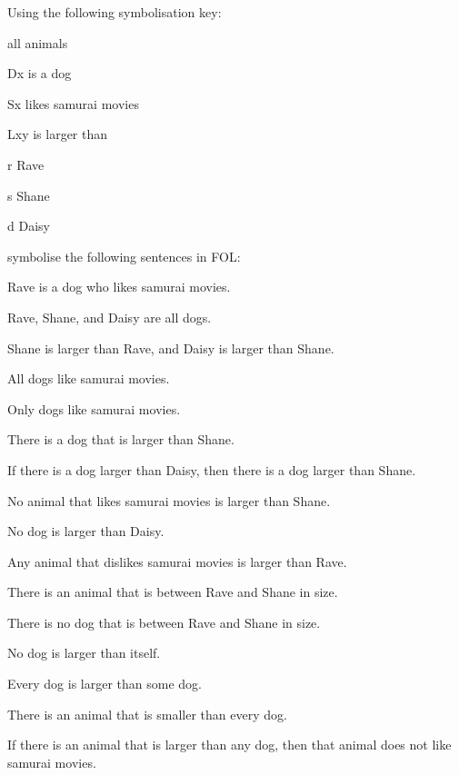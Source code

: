 \problempart 
Using the following symbolisation key:
\begin{ekey}
\item[\text{domain}] all animals
\item[Dx]  is a dog
\item[Sx]  likes samurai movies
\item[Lxy]  is larger than 
\item[r] Rave
\item[s] Shane
\item[d] Daisy
\end{ekey}
symbolise the following sentences in FOL:
\begin{earg}
\item Rave is a dog who likes samurai movies.
\item Rave, Shane, and Daisy are all dogs.
\item Shane is larger than Rave, and Daisy is larger than Shane.
\item All dogs like samurai movies.
\item Only dogs like samurai movies.
\item There is a dog that is larger than Shane.
\item If there is a dog larger than Daisy, then there is a dog larger than Shane.
\item No animal that likes samurai movies is larger than Shane.
\item No dog is larger than Daisy.
\item Any animal that dislikes samurai movies is larger than Rave.
\item There is an animal that is between Rave and Shane in size.
\item There is no dog that is between Rave and Shane in size.
\item No dog is larger than itself.
\item Every dog is larger than some dog.
\item There is an animal that is smaller than every dog.
\item If there is an animal that is larger than any dog, then that animal does not like samurai movies.
\end{earg}

